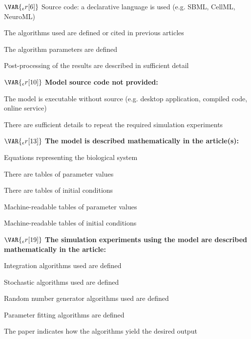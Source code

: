 \documentclass{article}
\begin{document}
\begin{tcolorbox}
\begin{todolist}
  \item[$\VAR{_er[6]}$] Source code: a declarative language is used (e.g. SBML, CellML, NeuroML)
  \begin{todolist}
    \item[\VAR{_er[7]}] The algorithms used are defined or cited in previous articles
    \item[\VAR{_er[8]}] The algorithm parameters are defined
    \item[\VAR{_er[9]}] Post-processing of the results are described in sufficient detail
  \end{todolist}
\end{todolist}
$\VAR{_er[10]}$ \textbf{Model source code not provided:}
\begin{todolist}
    \item[\VAR{_er[11]}] The model is executable without source (e.g. desktop application, compiled code, online service)
    \begin{todolist}
        \item[\VAR{_er[12]}] There are sufficient details to repeat the required simulation experiments
    \end{todolist}
\end{todolist}
$\VAR{_er[13]}$ \textbf{The model is described mathematically in the article(s):}
\begin{todolist}
    \item[\VAR{_er[14]}] Equations representing the biological system
    \item[\VAR{_er[15]}] There are tables of parameter values
    \item[\VAR{_er[16]}] There are tables of initial conditions
    \item[\VAR{_er[17]}] Machine-readable tables of parameter values
    \item[\VAR{_er[18]}] Machine-readable tables of initial conditions
\end{todolist}
$\VAR{_er[19]}$ \textbf{The simulation experiments using the model are described mathematically in the article:}
\begin{todolist}
    \item[\VAR{_er[20]}] Integration algorithms used are defined
    \item[\VAR{_er[21]}] Stochastic algorithms used are defined
    \item[\VAR{_er[22]}] Random number generator algorithms used are defined
    \item[\VAR{_er[23]}] Parameter fitting algorithms are defined
    \item[\VAR{_er[24]}] The paper indicates how the algorithms yield the desired output
\end{todolist}
\end{tcolorbox}
\end{document}
